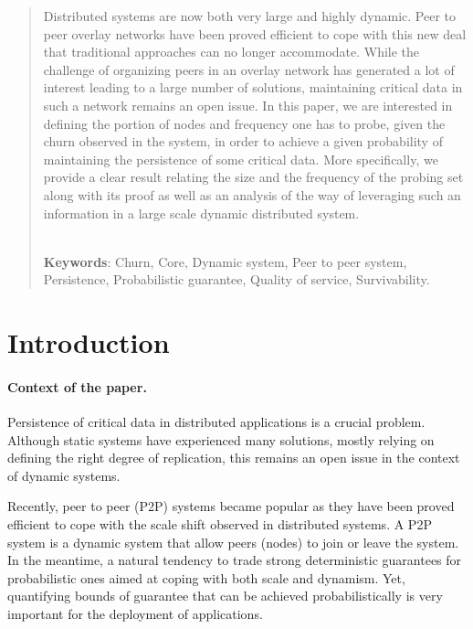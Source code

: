 \documentclass[]{llncs}
\begin{document}
\begin{abstract}
Distributed systems are now both very large and highly dynamic.
Peer to peer overlay networks have been proved efficient to cope with this new deal 
that  traditional approaches  can no  longer accommodate.  While the challenge of 
organizing
peers in an overlay network has generated a lot of interest leading to a
large number  of solutions,  maintaining  critical data  in such  a network
remains an open issue.  In this  paper, we are interested  in defining the
portion of nodes and frequency  one  has to probe, given the churn observed
in the system, in order to achieve a given  
probability of maintaining the persistence of some critical data. 
More  specifically, we provide  a clear  result relating  the size  and the
frequency of the probing set along with its proof as well as an analysis of
the  way  of leveraging   such  an information  in  a  large scale  dynamic
distributed system. 


~\\
\noindent
{\bf  Keywords}:   Churn,  Core,  Dynamic  system, Peer   to  peer  system,
Persistence, Probabilistic guarantee, Quality of service,  Survivability.   
\end{abstract}





\section{Introduction}

\paragraph{Context of the paper.}
Persistence of critical data in distributed applications is a crucial problem.
Although static systems have experienced many solutions, 
mostly relying
on defining the right degree  of replication, this remains  an open
issue in the context of dynamic systems. 

Recently, peer to peer (P2P) systems became popular 
as they
have been proved efficient to cope with the scale shift observed in
distributed systems.  A P2P system is a dynamic system that allow
peers (nodes) to join or leave the system. 
In the meantime, a natural tendency to trade 
strong deterministic guarantees for probabilistic ones aimed
at coping with both scale and dynamism.
Yet, quantifying bounds of guarantee that can be achieved probabilistically is 
very important for the deployment of applications. 
\end{document}
